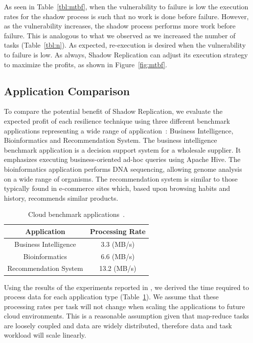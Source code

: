 As seen in Table~\ref{tbl:mtbf}, when the vulnerability to
failure is low the execution rates for the shadow process is such
that no work is done before failure. However, as the
vulnerability increases, the shadow process performs more work before
failure. This is analogous to what we observed as we increased the
number of tasks (Table~\ref{tbl:n}). As expected,
re-execution is desired when the vulnerability to failure is
low. As always, Shadow Replication can adjust its execution strategy to maximize the profits, as shown in Figure~\ref{fig:mtbf}.

\subsection{Application Comparison}

To compare the potential benefit of Shadow Replication, we evaluate
the expected profit of each resilience technique using three different
benchmark applications representing a wide range of
application~\cite{mrbs}: Business Intelligence, Bioinformatics and
Recommendation System. The business intelligence benchmark application
is a decision support system for a wholesale supplier. It emphasizes
executing business-oriented ad-hoc queries using Apache Hive. The
bioinformatics application performs DNA sequencing, allowing genome
analysis on a wide range of organisms. The recommendation system is
similar to those typically found in e-commerce sites which, based upon
browsing habits and history, recommends similar
products.

\begin{table}[h]
	\centering
    	\caption{Cloud benchmark applications~\cite{mrbs}.}
		\begin{tabular}{|c|c|}
			\hline
			Application               & Processing Rate \\
			\hline
			Business Intelligence     & 3.3 (MB/s)      \\ 
			Bioinformatics            & 6.6 (MB/s)      \\ 
			Recommendation System     & 13.2 (MB/s)     \\
			\hline
       \end{tabular}
	   \label{tbl:application_processing_rates}
\end{table}

Using the results of the experiments reported in \cite{mrbs}, we
derived the time required to process data for each application type (Table~\ref{tbl:application_processing_rates}). We assume that
these processing rates per task will not change when scaling the
applications to future cloud environments. This is a reasonable
assumption given that map-reduce tasks are loosely coupled and data
are widely distributed, therefore data and task workload will scale
linearly.

